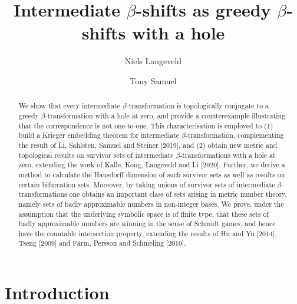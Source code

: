 \documentclass[a4paper,reqno,10pt]{amsart}
\title{Intermediate $\beta$-shifts as greedy $\beta$-shifts with a hole}
\author{Niels Langeveld}
\author{Tony Samuel}
\begin{document}
\null

\vspace{-1.25em}

\maketitle

\vspace{-2.75em}
 
\begin{abstract}
We show that every intermediate \mbox{$\beta$-transformation} is topologically conjugate to a greedy \mbox{$\beta$-transformation} with a hole at zero,  and provide a counterexample illustrating that the correspondence is not \mbox{one-to-one}.  This characterisation is employed to (1) build a Krieger embedding theorem for intermediate \mbox{$\beta$-transformation}, complementing the result of Li, Sahlsten, Samuel and Steiner [2019], and (2) obtain new metric and topological results on survivor sets of intermediate \mbox{$\beta$-transformations} with a hole at zero, extending the work of Kalle, Kong, Langeveld and Li [2020]. Further, we derive a method to calculate the Hausdorff dimension of such survivor sets as well as results on certain bifurcation sets.  Moreover, by taking unions of survivor sets of intermediate \mbox{$\beta$-transformations} one obtains an important class of sets arising in metric number theory, namely sets of badly approximable numbers in non-integer bases.  We prove, under the assumption that the underlying symbolic space is of finite type, that these sets of badly approximable numbers are winning in the sense of Schmidt games, and hence have the countable intersection property, extending the results of Hu and Yu [2014], Tseng [2009] and F\"{a}rm, Persson and Schmeling [2010].
\end{abstract}

%
%
%
\section{Introduction}\label{sec:intro}
%
%
%
\end{document}
